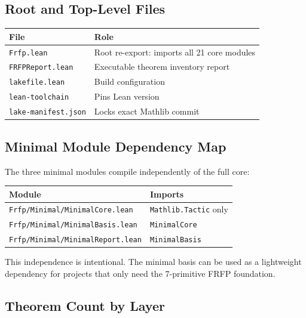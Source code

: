 \subsection*{Root and Top-Level Files}

\begin{center}
\begin{tabular}{ll}
\toprule
File & Role \\
\midrule
\texttt{Frfp.lean} & Root re-export: imports all 21 core modules \\
\texttt{FRFPReport.lean} & Executable theorem inventory report \\
\texttt{lakefile.lean} & Build configuration \\
\texttt{lean-toolchain} & Pins Lean version \\
\texttt{lake-manifest.json} & Locks exact Mathlib commit \\
\bottomrule
\end{tabular}
\end{center}

\subsection*{Minimal Module Dependency Map}

The three minimal modules compile independently of the full core:

\begin{center}
\begin{tabular}{ll}
\toprule
Module & Imports \\
\midrule
\texttt{Frfp/Minimal/MinimalCore.lean} & \texttt{Mathlib.Tactic} only \\
\texttt{Frfp/Minimal/MinimalBasis.lean} & \texttt{MinimalCore} \\
\texttt{Frfp/Minimal/MinimalReport.lean} & \texttt{MinimalBasis} \\
\bottomrule
\end{tabular}
\end{center}

This independence is intentional. The minimal basis can be used as a lightweight
dependency for projects that only need the 7-primitive FRFP foundation.

\subsection*{Theorem Count by Layer}

